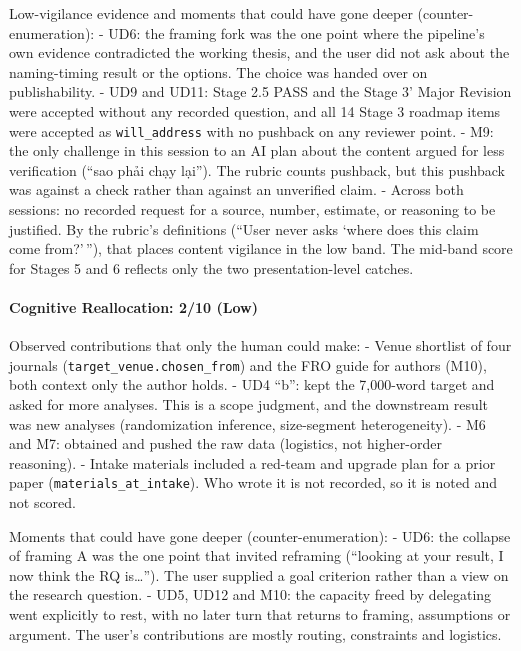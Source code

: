 \documentclass[12pt,a4paper]{article}
\begin{document}
Low-vigilance evidence and moments that could have gone deeper
(counter-enumeration): - UD6: the framing fork was the one point where
the pipeline's own evidence contradicted the working thesis, and the
user did not ask about the naming-timing result or the options. The
choice was handed over on publishability. - UD9 and UD11: Stage 2.5 PASS
and the Stage 3' Major Revision were accepted without any recorded
question, and all 14 Stage 3 roadmap items were accepted as
\texttt{will\_address} with no pushback on any reviewer point. - M9: the
only challenge in this session to an AI plan about the content argued
for less verification (``sao phải chạy lại''). The rubric counts
pushback, but this pushback was against a check rather than against an
unverified claim. - Across both sessions: no recorded request for a
source, number, estimate, or reasoning to be justified. By the rubric's
definitions (``User never asks `where does this claim come from?'\,''),
that places content vigilance in the low band. The mid-band score for
Stages 5 and 6 reflects only the two presentation-level catches.

\hypertarget{cognitive-reallocation-210-low}{%
\paragraph{Cognitive Reallocation: 2/10
(Low)}\label{cognitive-reallocation-210-low}}

Observed contributions that only the human could make: - Venue shortlist
of four journals (\texttt{target\_venue.chosen\_from}) and the FRO guide
for authors (M10), both context only the author holds. - UD4 ``b'': kept
the 7,000-word target and asked for more analyses. This is a scope
judgment, and the downstream result was new analyses (randomization
inference, size-segment heterogeneity). - M6 and M7: obtained and pushed
the raw data (logistics, not higher-order reasoning). - Intake materials
included a red-team and upgrade plan for a prior paper
(\texttt{materials\_at\_intake}). Who wrote it is not recorded, so it is
noted and not scored.

Moments that could have gone deeper (counter-enumeration): - UD6: the
collapse of framing A was the one point that invited reframing
(``looking at your result, I now think the RQ is\ldots{}''). The user
supplied a goal criterion rather than a view on the research question. -
UD5, UD12 and M10: the capacity freed by delegating went explicitly to
rest, with no later turn that returns to framing, assumptions or
argument. The user's contributions are mostly routing, constraints and
logistics.
\end{document}
